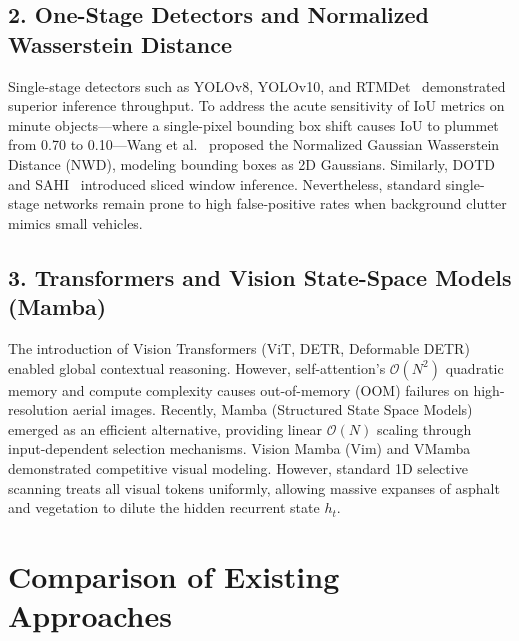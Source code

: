 \documentclass[12pt,a4paper]{report}
\begin{document}
\subsection{2. One-Stage Detectors and Normalized Wasserstein Distance}
Single-stage detectors such as YOLOv8, YOLOv10, and RTMDet~\cite{lyu2022rtmdet} demonstrated superior inference throughput. To address the acute sensitivity of IoU metrics on minute objects—where a single-pixel bounding box shift causes IoU to plummet from 0.70 to 0.10—Wang et al.~\cite{wang2021nwd} proposed the Normalized Gaussian Wasserstein Distance (NWD), modeling bounding boxes as 2D Gaussians. Similarly, DOTD~\cite{xu2021dotd} and SAHI~\cite{akyron2022sahi} introduced sliced window inference. Nevertheless, standard single-stage networks remain prone to high false-positive rates when background clutter mimics small vehicles.

\subsection{3. Transformers and Vision State-Space Models (Mamba)}
The introduction of Vision Transformers (ViT, DETR, Deformable DETR) enabled global contextual reasoning. However, self-attention's $\mathcal{O}(N^2)$ quadratic memory and compute complexity causes out-of-memory (OOM) failures on high-resolution aerial images. Recently, Mamba (Structured State Space Models)~\cite{gu2023mamba} emerged as an efficient alternative, providing linear $\mathcal{O}(N)$ scaling through input-dependent selection mechanisms. Vision Mamba (Vim) and VMamba~\cite{liu2024vmamba} demonstrated competitive visual modeling. However, standard 1D selective scanning treats all visual tokens uniformly, allowing massive expanses of asphalt and vegetation to dilute the hidden recurrent state $h_t$.

\section{Comparison of Existing Approaches}
\end{document}
